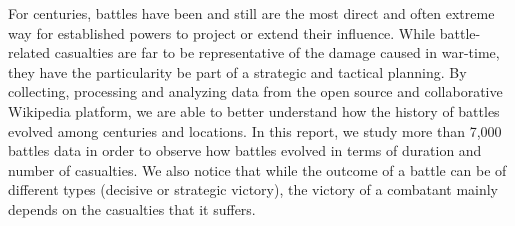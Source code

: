 For centuries, battles have been and still are the most direct and often extreme way for established powers to project or extend their influence. While battle-related casualties are far to be representative of the damage caused in war-time, they have the particularity be part of a strategic and tactical planning. By collecting, processing and analyzing data from the open source and collaborative Wikipedia platform, we are able to better understand how the history of battles evolved among centuries and locations. In this report, we study more than 7,000 battles data in order to observe how battles evolved in terms of duration and number of casualties. We also notice that while the outcome of a battle can be of different types (decisive or strategic victory), the victory of a combatant mainly depends on the casualties that it suffers.